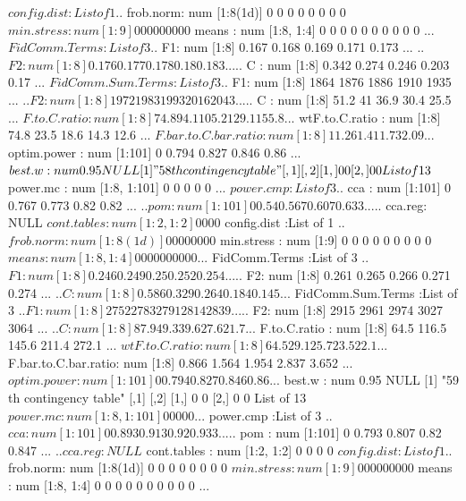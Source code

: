\documentclass[11pt]{article} %
\begin{document}
\begin{Schunk}
\begin{Soutput}
 $ config.dist         :List of 1
  ..$ frob.norm: num [1:8(1d)] 0 0 0 0 0 0 0 0
 $ min.stress          : num [1:9] 0 0 0 0 0 0 0 0 0
 $ means               : num [1:8, 1:4] 0 0 0 0 0 0 0 0 0 0 ...
 $ FidComm.Terms       :List of 3
  ..$ F1: num [1:8] 0.167 0.168 0.169 0.171 0.173 ...
  ..$ F2: num [1:8] 0.176 0.177 0.178 0.18 0.183 ...
  ..$ C : num [1:8] 0.342 0.274 0.246 0.203 0.17 ...
 $ FidComm.Sum.Terms   :List of 3
  ..$ F1: num [1:8] 1864 1876 1886 1910 1935 ...
  ..$ F2: num [1:8] 1972 1983 1993 2016 2043 ...
  ..$ C : num [1:8] 51.2 41 36.9 30.4 25.5 ...
 $ F.to.C.ratio        : num [1:8] 74.8 94.1 105.2 129.1 155.8 ...
 $ wtF.to.C.ratio      : num [1:8] 74.8 23.5 18.6 14.3 12.6 ...
 $ F.bar.to.C.bar.ratio: num [1:8] 1 1.26 1.41 1.73 2.09 ...
 $ optim.power         : num [1:101] 0 0.794 0.827 0.846 0.86 ...
 $ best.w              : num 0.95
NULL
[1] "58 th contingency table"
     [,1] [,2]
[1,]    0    0
[2,]    0    0
List of 13
 $ power.mc            : num [1:8, 1:101] 0 0 0 0 0 ...
 $ power.cmp           :List of 3
  ..$ cca    : num [1:101] 0 0.767 0.773 0.82 0.82 ...
  ..$ pom    : num [1:101] 0 0.54 0.567 0.607 0.633 ...
  ..$ cca.reg: NULL
 $ cont.tables         : num [1:2, 1:2] 0 0 0 0
 $ config.dist         :List of 1
  ..$ frob.norm: num [1:8(1d)] 0 0 0 0 0 0 0 0
 $ min.stress          : num [1:9] 0 0 0 0 0 0 0 0 0
 $ means               : num [1:8, 1:4] 0 0 0 0 0 0 0 0 0 0 ...
 $ FidComm.Terms       :List of 3
  ..$ F1: num [1:8] 0.246 0.249 0.25 0.252 0.254 ...
  ..$ F2: num [1:8] 0.261 0.265 0.266 0.271 0.274 ...
  ..$ C : num [1:8] 0.586 0.329 0.264 0.184 0.145 ...
 $ FidComm.Sum.Terms   :List of 3
  ..$ F1: num [1:8] 2752 2783 2791 2814 2839 ...
  ..$ F2: num [1:8] 2915 2961 2974 3027 3064 ...
  ..$ C : num [1:8] 87.9 49.3 39.6 27.6 21.7 ...
 $ F.to.C.ratio        : num [1:8] 64.5 116.5 145.6 211.4 272.1 ...
 $ wtF.to.C.ratio      : num [1:8] 64.5 29.1 25.7 23.5 22.1 ...
 $ F.bar.to.C.bar.ratio: num [1:8] 0.866 1.564 1.954 2.837 3.652 ...
 $ optim.power         : num [1:101] 0 0.794 0.827 0.846 0.86 ...
 $ best.w              : num 0.95
NULL
[1] "59 th contingency table"
     [,1] [,2]
[1,]    0    0
[2,]    0    0
List of 13
 $ power.mc            : num [1:8, 1:101] 0 0 0 0 0 ...
 $ power.cmp           :List of 3
  ..$ cca    : num [1:101] 0 0.893 0.913 0.92 0.933 ...
  ..$ pom    : num [1:101] 0 0.793 0.807 0.82 0.847 ...
  ..$ cca.reg: NULL
 $ cont.tables         : num [1:2, 1:2] 0 0 0 0
 $ config.dist         :List of 1
  ..$ frob.norm: num [1:8(1d)] 0 0 0 0 0 0 0 0
 $ min.stress          : num [1:9] 0 0 0 0 0 0 0 0 0
 $ means               : num [1:8, 1:4] 0 0 0 0 0 0 0 0 0 0 ...

\end{Soutput}
\end{Schunk}
\end{document}
